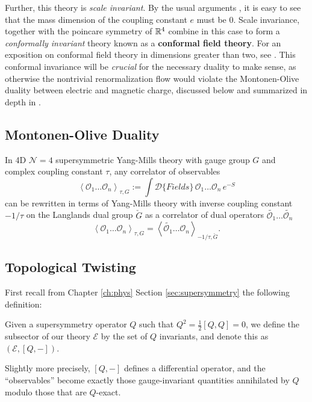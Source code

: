 Further, this theory is \emph{scale invariant}. By the usual arguments \cite{schwartz2014}, it is easy to see that the mass dimension of the coupling constant $e$ must be 0. Scale invariance, together with the poincare symmetry of $\mathbb{R}^4$ combine in this case to form a \emph{conformally invariant} theory known as a \textbf{conformal field theory}. For an exposition on conformal field theory in dimensions greater than two, see \cite{simmons2016}. This conformal invariance will be \emph{crucial} for the necessary duality to make sense, as otherwise the nontrivial renormalization flow would violate the Montonen-Olive duality between electric and magnetic charge, discussed below and summarized in depth in \cite{kapustin2008}.



\subsection{Montonen-Olive Duality} %
\label{sub:montonen_olive_duality}

	\begin{concept}
		In 4D $\mathcal N = 4$ supersymmetric Yang-Mills theory with gauge group $G$ and complex coupling constant $\tau$, any correlator of observables
		\[
			\left< \mathcal O_1 \dots \mathcal O_n \right>_{\tau, G} := \int \mathcal{D}\{ Fields \}\, \mathcal O_1 \dots \mathcal O_n \, e^{-S}
		\]
		can be rewritten in terms of Yang-Mills theory with inverse coupling constant $-1/\tau$ on the Langlands dual group $\check G$ as a correlator of dual operators $\tilde {\mathcal O_1} \dots \tilde {\mathcal O_n}$
		\[
			\left< \mathcal O_1 \dots \mathcal O_n \right>_{\tau, G} = \left< \tilde{\mathcal O_1} \dots \mathcal O_n \right>_{-1/\tau, \check G}.
		\]
	\end{concept}
	

\subsection{Topological Twisting} %
\label{sub:topological_twisting}

	First recall from Chapter \ref{ch:phys} Section \ref{sec:supersymmetry} the following definition: 
	\begin{defn}[Subsector]
		Given a supersymmetry operator $Q$ such that $Q^2 = \frac{1}{2} [Q, Q] = 0$, we define the subsector of our theory $\mathcal E$ by the set of $Q$ invariants, and denote this as $(\mathcal E, [Q, -])$.
		
		Slightly more precisely, $[Q, -]$ defines a differential operator, and the ``observables'' become exactly those gauge-invariant quantities annihilated by $Q$ modulo those that are $Q$-exact.
	\end{defn}

